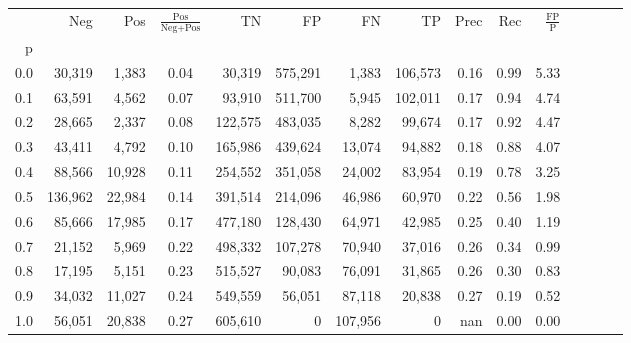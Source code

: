 \begin{tabular}{rrrcrrrrrrrrrrr}
\toprule
{} &      Neg &     Pos & $\frac{\text{Pos}}{\text{Neg}+\text{Pos}}$ &       TN &       FP &       FN &       TP &  Prec &   Rec & $\frac{\text{FP}}{\text{P}}$ \\
p   &          &         &                                            &          &          &          &          &       &       &                              \\
\midrule
0.0 &   30,319 &   1,383 &                                       0.04 &   30,319 &  575,291 &    1,383 &  106,573 &  0.16 &  0.99 &                         5.33 \\
0.1 &   63,591 &   4,562 &                                       0.07 &   93,910 &  511,700 &    5,945 &  102,011 &  0.17 &  0.94 &                         4.74 \\
0.2 &   28,665 &   2,337 &                                       0.08 &  122,575 &  483,035 &    8,282 &   99,674 &  0.17 &  0.92 &                         4.47 \\
0.3 &   43,411 &   4,792 &                                       0.10 &  165,986 &  439,624 &   13,074 &   94,882 &  0.18 &  0.88 &                         4.07 \\
0.4 &   88,566 &  10,928 &                                       0.11 &  254,552 &  351,058 &   24,002 &   83,954 &  0.19 &  0.78 &                         3.25 \\
0.5 &  136,962 &  22,984 &                                       0.14 &  391,514 &  214,096 &   46,986 &   60,970 &  0.22 &  0.56 &                         1.98 \\
0.6 &   85,666 &  17,985 &                                       0.17 &  477,180 &  128,430 &   64,971 &   42,985 &  0.25 &  0.40 &                         1.19 \\
0.7 &   21,152 &   5,969 &                                       0.22 &  498,332 &  107,278 &   70,940 &   37,016 &  0.26 &  0.34 &                         0.99 \\
0.8 &   17,195 &   5,151 &                                       0.23 &  515,527 &   90,083 &   76,091 &   31,865 &  0.26 &  0.30 &                         0.83 \\
0.9 &   34,032 &  11,027 &                                       0.24 &  549,559 &   56,051 &   87,118 &   20,838 &  0.27 &  0.19 &                         0.52 \\
1.0 &   56,051 &  20,838 &                                       0.27 &  605,610 &        0 &  107,956 &        0 &   nan &  0.00 &                         0.00 \\
\bottomrule
\end{tabular}
